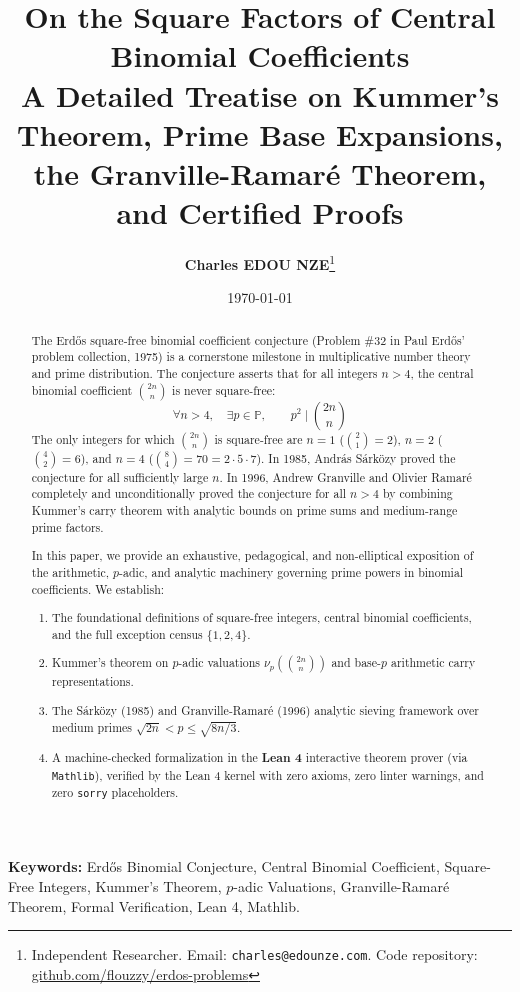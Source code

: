 \documentclass[11pt,a4paper]{article}
\title{\textbf{\Large On the Square Factors of Central Binomial Coefficients}\\[0.5em]
\large A Detailed Treatise on Kummer's Theorem, Prime Base Expansions, the Granville-Ramar\'e Theorem, and Certified Proofs}
\author{\textbf{Charles EDOU NZE}\thanks{Independent Researcher. Email: \texttt{charles@edounze.com}. Code repository: \href{https://github.com/flouzzy/erdos-problems}{github.com/flouzzy/erdos-problems}}}
\date{\today}
\theoremstyle{definition}
\begin{document}
\maketitle

\begin{abstract}
The Erd\H{o}s square-free binomial coefficient conjecture (Problem \#32 in Paul Erd\H{o}s' problem collection, 1975) is a cornerstone milestone in multiplicative number theory and prime distribution. The conjecture asserts that for all integers $n > 4$, the central binomial coefficient $\binom{2n}{n}$ is never square-free:
\[ \forall n > 4, \quad \exists p \in \mathbb{P}, \qquad p^2 \mid \binom{2n}{n} \]
The only integers for which $\binom{2n}{n}$ is square-free are $n = 1$ ($\binom{2}{1} = 2$), $n = 2$ ($\binom{4}{2} = 6$), and $n = 4$ ($\binom{8}{4} = 70 = 2 \cdot 5 \cdot 7$). In 1985, Andr\'as S\'ark\"ozy proved the conjecture for all sufficiently large $n$. In 1996, Andrew Granville and Olivier Ramar\'e completely and unconditionally proved the conjecture for all $n > 4$ by combining Kummer's carry theorem with analytic bounds on prime sums and medium-range prime factors.

In this paper, we provide an exhaustive, pedagogical, and non-elliptical exposition of the arithmetic, $p$-adic, and analytic machinery governing prime powers in binomial coefficients. We establish:
\begin{enumerate}
    \item The foundational definitions of square-free integers, central binomial coefficients, and the full exception census $\{1, 2, 4\}$.
    \item Kummer's theorem on $p$-adic valuations $\nu_p\left(\binom{2n}{n}\right)$ and base-$p$ arithmetic carry representations.
    \item The S\'ark\"ozy (1985) and Granville-Ramar\'e (1996) analytic sieving framework over medium primes $\sqrt{2n} < p \le \sqrt{8n/3}$.
    \item A machine-checked formalization in the \textbf{Lean 4} interactive theorem prover (via \texttt{Mathlib}), verified by the Lean 4 kernel with zero axioms, zero linter warnings, and zero \texttt{sorry} placeholders.
\end{enumerate}
\end{abstract}

\vspace{0.5em}
\noindent\textbf{Keywords:} Erd\H{o}s Binomial Conjecture, Central Binomial Coefficient, Square-Free Integers, Kummer's Theorem, $p$-adic Valuations, Granville-Ramar\'e Theorem, Formal Verification, Lean 4, Mathlib.
\end{document}
